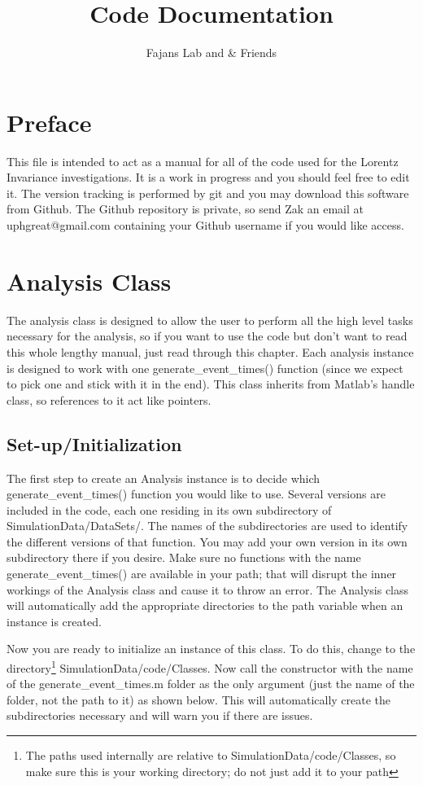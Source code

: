 \documentclass[12pt]{report}
\author{Fajans Lab and \& Friends}
\title{Code Documentation}
\begin{document}
\maketitle

\chapter*{Preface}
This file is intended to act as a manual for all of the code used for the Lorentz Invariance investigations.  It is a work in progress and you should feel free to edit it.  The version tracking is performed by git and you may download this software from Github.  The Github repository is private, so send Zak an email at uphgreat@gmail.com containing your Github username if you would like access.

\tableofcontents



\chapter{Analysis Class}
The analysis class is designed to allow the user to perform all the high level tasks necessary for the analysis, so if you want to use the code but don't want to read this whole lengthy manual, just read through this chapter.  Each analysis instance is designed to work with one generate\_event\_times() function (since we expect to pick one and stick with it in the end).  This class inherits from Matlab's handle class, so references to it act like pointers.

\section{Set-up/Initialization}
The first step to create an Analysis instance is to decide which generate\_event\_times() function you would like to use.  Several versions are included in the code, each one residing in its own subdirectory of SimulationData/DataSets/.  The names of the subdirectories are used to identify the different versions of that function.  You may add your own version in its own subdirectory there if you desire.  Make sure no functions with the name generate\_event\_times() are available in your path; that will disrupt the inner workings of the Analysis class and cause it to throw an error.  The Analysis class will automatically add the appropriate directories to the path variable when an instance is created.

Now you are ready to initialize an instance of this class.  To do this, change to the directory\footnote{The paths used internally are relative to SimulationData/code/Classes, so make sure this is your working directory; do not just add it to your path} SimulationData/code/Classes.  Now call the constructor with the name of the generate\_event\_times.m folder as the only argument (just the name of the folder, not the path to it) as shown below.  This will automatically create the subdirectories necessary and will warn you if there are issues.
\end{document}
